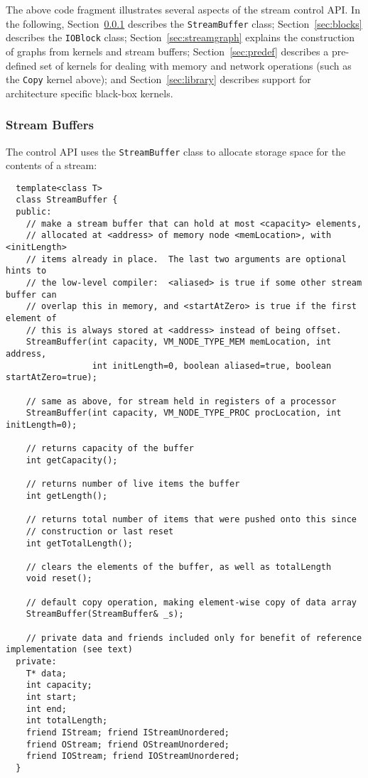 The above code fragment illustrates several aspects of the stream
control API.  In the following, Section~\ref{sec:procstreams}
describes the {\tt StreamBuffer} class; Section~\ref{sec:blocks}
describes the {\tt IOBlock} class; Section~\ref{sec:streamgraph}
explains the construction of graphs from kernels and stream buffers;
Section~\ref{sec:predef} describes a pre-defined set of kernels for
dealing with memory and network operations (such as the {\tt Copy}
kernel above); and Section~\ref{sec:library} describes support for
architecture specific black-box kernels.

\subsubsection{Stream Buffers}
\label{sec:procstreams}

The control API uses the {\tt StreamBuffer} class to allocate storage
space for the contents of a stream:
{\small
\begin{verbatim}
  template<class T>
  class StreamBuffer {
  public:
    // make a stream buffer that can hold at most <capacity> elements,
    // allocated at <address> of memory node <memLocation>, with <initLength>
    // items already in place.  The last two arguments are optional hints to
    // the low-level compiler:  <aliased> is true if some other stream buffer can
    // overlap this in memory, and <startAtZero> is true if the first element of
    // this is always stored at <address> instead of being offset.
    StreamBuffer(int capacity, VM_NODE_TYPE_MEM memLocation, int address, 
                 int initLength=0, boolean aliased=true, boolean startAtZero=true);

    // same as above, for stream held in registers of a processor
    StreamBuffer(int capacity, VM_NODE_TYPE_PROC procLocation, int initLength=0);

    // returns capacity of the buffer
    int getCapacity();

    // returns number of live items the buffer
    int getLength();

    // returns total number of items that were pushed onto this since
    // construction or last reset
    int getTotalLength();

    // clears the elements of the buffer, as well as totalLength
    void reset();

    // default copy operation, making element-wise copy of data array
    StreamBuffer(StreamBuffer& _s);

    // private data and friends included only for benefit of reference implementation (see text)
  private:
    T* data;
    int capacity;
    int start;
    int end;
    int totalLength;
    friend IStream; friend IStreamUnordered;
    friend OStream; friend OStreamUnordered;
    friend IOStream; friend IOStreamUnordered;
  }
\end{verbatim}}


